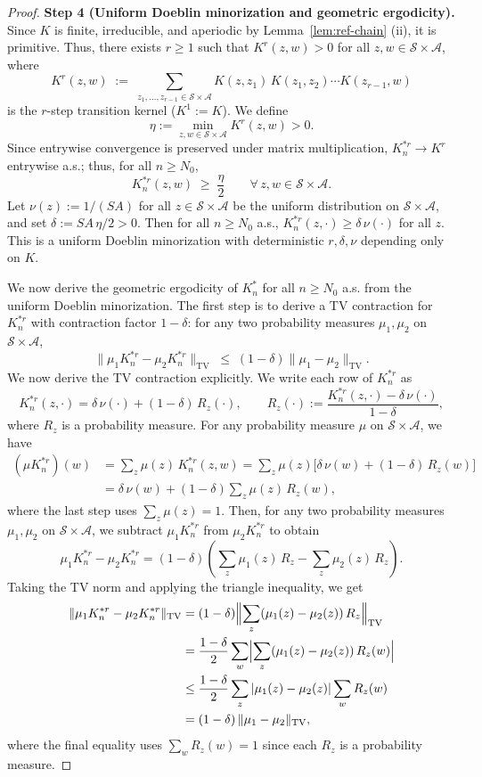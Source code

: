 \documentclass{article}
\numberwithin{equation}{section}
\begin{document}
\begin{proof}
\medskip\noindent\textbf{Step 4 (Uniform Doeblin minorization and geometric ergodicity).}
Since $K$ is finite, irreducible, and aperiodic by Lemma~\ref{lem:ref-chain} (ii), it is primitive. Thus, there exists $r\ge 1$ such that $K^r(z,w)>0$ for all $z,w\in\mathcal{S}\times\mathcal{A}$, where
\[
K^r(z,w) \;:=\; \sum_{z_1,\ldots,z_{r-1}\in\mathcal{S}\times\mathcal{A}}
K(z,z_1)\,K(z_1,z_2)\cdots K(z_{r-1},w)
\]
is the $r$-step transition kernel ($K^1 := K$).
We define
\[
\eta := \min_{z,w\in\mathcal{S}\times\mathcal{A}} K^r(z,w) > 0.
\]
Since entrywise convergence is preserved under matrix multiplication, $K_n^{\ast r}\to K^r$ entrywise a.s.; thus, for all $n\ge N_0$,
\[
K_n^{\ast r}(z,w) \;\ge\; \frac{\eta}{2} \qquad \forall\, z,w\in\mathcal{S}\times\mathcal{A}.
\]
Let $\nu(z) := 1/(SA)$ for all $z\in\mathcal{S}\times\mathcal{A}$ be the uniform distribution on $\mathcal{S}\times\mathcal{A}$, and set $\delta := SA\,\eta/2 > 0$. Then for all $n\ge N_0$ a.s., $K_n^{\ast r}(z,\cdot)\ge\delta\,\nu(\cdot)$ for all $z$. This is a uniform Doeblin minorization with deterministic $r,\delta,\nu$ depending only on $K$.

We now derive the geometric ergodicity of $K_n^\ast$ for all $n\ge N_0$ a.s. from the uniform Doeblin minorization.
The first step is to derive a TV contraction for $K_n^{\ast r}$ with contraction factor $1-\delta$: for any two probability measures $\mu_1,\mu_2$ on $\mathcal{S}\times\mathcal{A}$,
\[
\|\mu_1 K_n^{\ast r} - \mu_2 K_n^{\ast r}\|_{\mathrm{TV}}
\;\le\; (1-\delta)\|\mu_1-\mu_2\|_{\mathrm{TV}}.
\] 
We now derive the TV contraction explicitly. We write each row of $K_n^{\ast r}$ as
\[
K_n^{\ast r}(z,\cdot) = \delta\,\nu(\cdot) + (1-\delta)\,R_z(\cdot),
\qquad
R_z(\cdot) := \frac{K_n^{\ast r}(z,\cdot)-\delta\,\nu(\cdot)}{1-\delta},
\]
where $R_z$ is a probability measure. 
For any probability measure $\mu$ on $\mathcal{S}\times\mathcal{A}$, we have
\begin{align*}
(\mu K_n^{\ast r})(w)
&= \sum_z \mu(z)\,K_n^{\ast r}(z,w)
 = \sum_z \mu(z)\bigl[\delta\,\nu(w)+(1-\delta)\,R_z(w)\bigr]\\
&= \delta\,\nu(w) + (1-\delta)\sum_z \mu(z)\,R_z(w),
\end{align*}
where the last step uses $\sum_z\mu(z)=1$. 
Then, for any two probability measures $\mu_1,\mu_2$ on $\mathcal{S}\times\mathcal{A}$, we subtract $\mu_1 K_n^{\ast r}$ from $\mu_2 K_n^{\ast r}$ to obtain 
\[
\mu_1 K_n^{\ast r} - \mu_2 K_n^{\ast r}
= (1-\delta)\!\left(\sum_z \mu_1(z)\,R_z - \sum_z \mu_2(z)\,R_z\right).
\]
Taking the TV norm and applying the triangle inequality, we get
\begin{align*}
\|\mu_1 K_n^{\ast r} - \mu_2 K_n^{\ast r}\|_{\mathrm{TV}}
&= (1-\delta)\Bigl\|\sum_z (\mu_1(z)-\mu_2(z))\,R_z\Bigr\|_{\mathrm{TV}}\\
&= \frac{1-\delta}{2}\sum_w \Bigl|\sum_z (\mu_1(z)-\mu_2(z))\,R_z(w)\Bigr|\\
&\le \frac{1-\delta}{2}\sum_z |\mu_1(z)-\mu_2(z)|\sum_w R_z(w)\\
&= (1-\delta)\,\|\mu_1-\mu_2\|_{\mathrm{TV}},
\end{align*}
where the final equality uses $\sum_w R_z(w)=1$ since each $R_z$ is a probability measure.


\end{proof}
\end{document}
